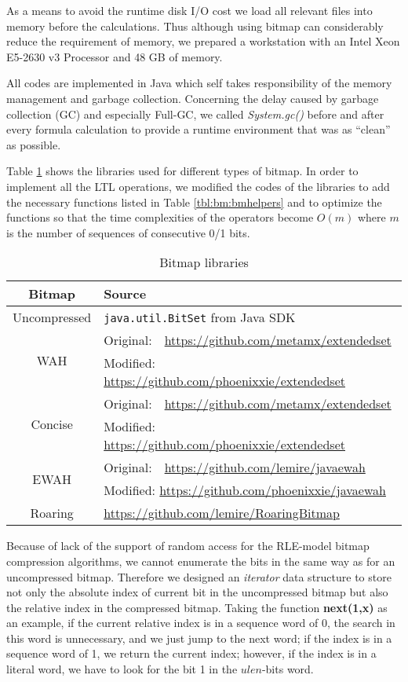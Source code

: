 As a means to avoid the runtime disk I/O cost we load all relevant files into memory before the calculations. Thus although using bitmap can considerably reduce the requirement of memory, we prepared a workstation with an Intel Xeon E5-2630 v3 Processor and 48 GB of memory.

All codes are implemented in Java which self takes responsibility of the memory management and garbage collection. Concerning the delay caused by garbage collection (GC) and especially Full-GC, we called \textit{System.gc()} before and after every formula calculation to provide a runtime environment that was as ``clean'' as possible.

Table \ref{table:bmlibs} shows the libraries used for different types of bitmap. In order to implement all the LTL operations, we modified the codes of the libraries to add the necessary functions listed in Table \ref{tbl:bm:bmhelpers} and to optimize the functions so that the time complexities of the operators become $O(m)$ where $m$ is the number of sequences of consecutive 0/1 bits.

\begin{table}
\centering
\begin{tabular}{|c|l|}
\hline
Bitmap & Source \\
\hline
Uncompressed & \texttt{java.util.BitSet} from Java SDK \\
\hline
\multirow{2}{*}{WAH} & Original:\ \ \url{https://github.com/metamx/extendedset} \\
& Modified: \url{https://github.com/phoenixxie/extendedset} \\
\hline
\multirow{2}{*}{Concise} & Original:\ \ \url{https://github.com/metamx/extendedset} \\
& Modified: \url{https://github.com/phoenixxie/extendedset} \\
\hline
\multirow{2}{*}{EWAH} & Original:\ \ \url{https://github.com/lemire/javaewah} \\
& Modified: \url{https://github.com/phoenixxie/javaewah} \\
\hline
Roaring & \url{https://github.com/lemire/RoaringBitmap} \\
\hline
\end{tabular}
\caption{Bitmap libraries}
\label{table:bmlibs}
\end{table}

Because of lack of the support of random access for the RLE-model bitmap compression algorithms, we cannot enumerate the bits in the same way as for an uncompressed bitmap. Therefore we designed an \emph{iterator} data structure to store not only the absolute index of current bit in the uncompressed bitmap but also the relative index in the compressed bitmap. Taking the function \textbf{next(1,x)} as an example, if the current relative index is in a sequence word of 0, the search in this word is unnecessary, and we just jump to the next word; if the index is in a sequence word of 1, we return the current index; however, if the index is in a literal word, we have to look for the bit 1 in the $ulen$-bits word.

